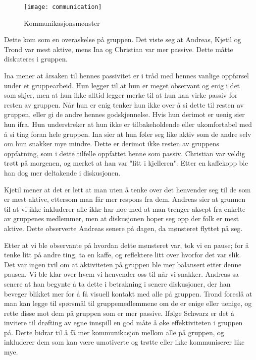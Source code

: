 	\begin{center}
		\begin{figure}
			\texttt{[image: communication]}
			\caption{Kommunikasjonsmønster}
		\end{figure}
	\end{center}

	Dette kom som en overaskelse på gruppen. Det viste seg at Andreas, Kjetil og Trond var mest aktive, mens Ina og Christian var mer passive. Dette måtte diskuteres i gruppen.

	Ina mener at årsaken til hennes passivitet er i tråd med hennes vanlige oppførsel under et gruppearbeid. Hun legger til at hun er meget observant og enig i det som skjer, men at hun ikke alltid legger merke til at hun kan virke passiv for resten av gruppen. Når hun er enig tenker hun ikke over å si dette til resten av gruppen, eller gi de andre hennes godskjennelse. Hvis hun derimot er uenig sier hun ifra. Hun understreker at hun ikke er tilbakeholdende eller ukomfortabel med å si ting foran hele gruppen. Ina sier at hun føler seg like aktiv som de andre selv om hun snakker mye mindre. Dette er derimot ikke resten av gruppens oppfatning, som i dette tilfelle oppfattet henne som passiv. Christian var veldig trøtt på morgenen, og merket at han var "litt i kjelleren". Etter en kaffekopp ble han dog mer deltakende i diskusjonen.

	Kjetil mener at det er lett at man uten å tenke over det henvender seg til de som er mest aktive, ettersom man får mer respons fra dem. Andreas sier at grunnen til at vi ikke inkluderer alle ikke har noe med at man trenger aksept fra enkelte av gruppenes medlemmer, men at diskusjonen hoper seg opp der folk er mest aktive. Dette observerte Andreas senere på dagen, da mønsteret flyttet på seg.

	Etter at vi ble observante på hvordan dette mønsteret var, tok vi en pause; for å tenke litt på andre ting, ta en kaffe, og reflektere litt over hvorfor det var slik. Det var ingen tvil om at aktiviteten på gruppen ble mer balansert etter denne pausen. Vi ble klar over hvem vi henvender oss til når vi snakker. Andreas sa senere at han begynte å ta dette i betrakning i senere diskusjoner, der han beveger blikket mer for å få visuell kontakt med alle på gruppen. Trond foreslå at man kan legge til spørsmål til gruppemedlemmene om de er enige eller uenige, og rette disse mot dem på gruppen som er mer passive. Ifølge Schwarz \cite{Schwarz} er det å invitere til drøfting av egne innspill en god måte å øke effektiviteten i gruppen på. Dette bidrar til å få mer kommunikasjon mellom alle på gruppen, og inkluderer dem som kan være umotiverte og trøtte eller ikke kommuniserer like mye. 

